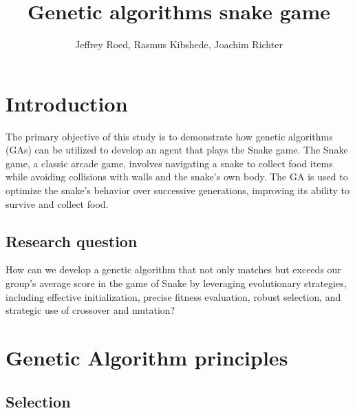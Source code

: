 \documentclass[a4paper, twocolumn]{article}
\author{Jeffrey Roed, Rasmus Kibshede, Joachim Richter}
\title{Genetic algorithms snake game}
\begin{document}

\section {Introduction\label{sec:Introduction}}
 
The primary objective of this study is to demonstrate how genetic algorithms (GAs) can be utilized to develop an agent that plays the Snake game. The Snake game, a classic arcade game, involves navigating a snake to collect food items while avoiding collisions with walls and the snake's own body. The GA is used to optimize the snake's behavior over successive generations, improving its ability to survive and collect food.

\subsection{Research question\label{sec:Research Question}}
How can we develop a genetic algorithm that not only matches but exceeds our group's average score in the game of Snake by leveraging evolutionary strategies, including effective initialization, precise fitness evaluation, robust selection, and strategic use of crossover and mutation?

\section{Genetic Algorithm principles\label{sec:Method}}

\subsection{Selection\label{sec:Selection}}
\end{document}
